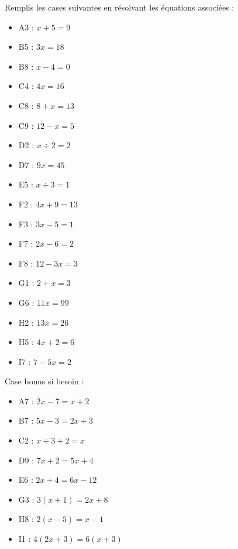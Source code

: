\begin{minipage}{0.40\textwidth}
Remplis les cases suivantes en résolvant les équations associées :
    \begin{multicols}{2}
        \begin{itemize}[leftmargin=1em]
            \item A3 : $x+5=9$
            \item B5 : $3x=18$
            \item B8 : $x-4=0$
            \item C4 : $4x=16$
            \item C8 : $8+x=13$
            \item C9 : $12-x=5$
            \item D2 : $x\div2=2$
            \item D7 : $9x=45$
            \item E5 : $x\div3=1$
            \item F2 : $4x+9=13$
            \item F3 : $3x-5=1$
            \item F7 : $2x-6=2$
            \item F8 : $12-3x=3$
            \item G1 : $2+x=3$
            \item G6 : $11x=99$
            \item H2 : $13x=26$
            \item H5 : $4x+2=6$
            \item I7 : $7-5x=2$
        \end{itemize}
    \end{multicols}

Case bonus si besoin :
        \begin{itemize}[leftmargin=1em]
            \item A7 : $2x-7=x+2$
            \item B7 : $5x-3=2x+3$
            \item C2 : $x\div3+2=x$
            \item D9 : $7x+2=5x+4$
            \item E6 : $2x+4=6x-12$
            \item G3 : $3(x+1)=2x+8$
            \item H8 : $2(x-5)=x-1$
            \item I1 : $4(2x+3)=6(x+3)$
        \end{itemize}
\end{minipage}


